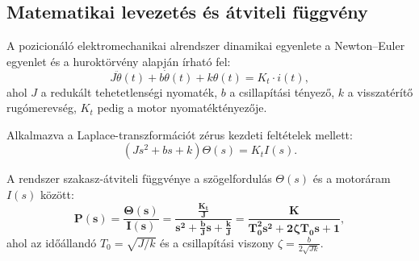 \subsection{Matematikai levezetés és átviteli függvény}
A pozicionáló elektromechanikai alrendszer dinamikai egyenlete a Newton--Euler egyenlet és a huroktörvény alapján írható fel:
\begin{equation}
  J \ddot{\theta}(t) + b \dot{\theta}(t) + k \theta(t) = K_t \cdot i(t),
  \label{eq:mechanical_motion}
\end{equation}
ahol $J$ a redukált tehetetlenségi nyomaték, $b$ a csillapítási tényező, $k$ a visszatérítő rugómerevség, $K_t$ pedig a motor nyomatéktényezője.

Alkalmazva a Laplace-transzformációt zérus kezdeti feltételek mellett:
\begin{equation}
  (J s^2 + b s + k) \Theta(s) = K_t I(s).
\end{equation}

A rendszer szakasz-átviteli függvénye a szögelfordulás $\Theta(s)$ és a motoráram $I(s)$ között:
\begin{equation}
  \mathbf{P(s) = \frac{\Theta(s)}{I(s)} = \frac{\frac{K_t}{J}}{s^2 + \frac{b}{J}s + \frac{k}{J}} = \frac{K}{T_0^2 s^2 + 2\zeta T_0 s + 1}},
  \label{eq:transfer_function}
\end{equation}
ahol az időállandó $T_0 = \sqrt{J/k}$ és a csillapítási viszony $\zeta = \frac{b}{2\sqrt{J k}}$.
